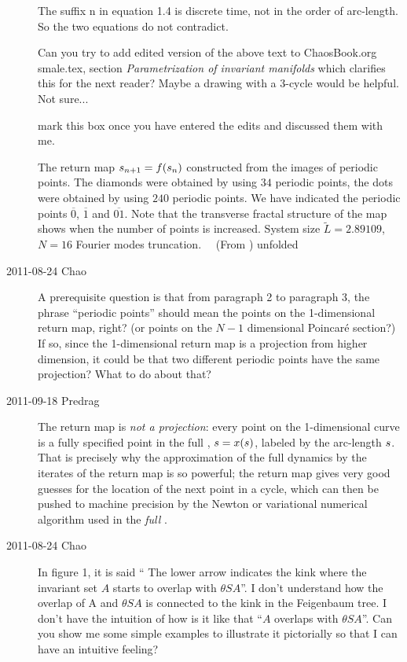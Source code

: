 \begin{description}
The suffix n in equation 1.4 is discrete time, not in the order of arc-length. So the two equations do not contradict. 

Can you try to add edited version of the above text to ChaosBook.org
smale.tex, section {\em Parametrization of invariant manifolds} which
clarifies this for the next reader? Maybe a drawing with a 3-cycle would
be helpful. Not sure...

 mark this box once you have entered the
edits and discussed them with me.

{}{
The return map $s_{n+1} = f(s_n)$ constructed from the images of periodic
points. The diamonds were obtained by using $34$ periodic points, the
dots were obtained by using $240$ periodic points. We have indicated the
periodic points $\overline{0}$, $\overline{1}$ and $\overline{01}$. Note
that the transverse fractal structure of the map shows when the number of
points is increased.
System size $ \tilde{L} = 2.89109$, $N=16$ Fourier modes truncation.
~~(From )
}{unfolded}


\item[2011-08-24 Chao]
A prerequisite question is that from paragraph 2 to paragraph 3, the
phrase ``periodic points'' should mean the points on the 1-dimensional
return map, right? (or points on the $N-1$ dimensional Poincar\'e
section?) If so, since the 1-dimensional return map is a projection from
higher dimension, it could be that two different periodic points have the
same projection? What to do about that?

\item[2011-09-18 Predrag]                            \toCB
The return map  is \emph{not a projection}: every point
on the 1-dimensional curve is a fully specified point in the full
\statesp, $s = x(s)$, labeled by the arc-length $s$. That is precisely
why the approximation of the full dynamics by the iterates of the return
map is so powerful; the return map gives very good guesses for the
location of the next point in a cycle, which can then be pushed to
machine precision by the Newton or variational numerical algorithm used
in the \emph{full \statesp}.

\item[2011-08-24 Chao]
In figure 1, it is said `` The lower arrow indicates the kink where the
invariant set $A$ starts to overlap with $\theta SA$''. I don't understand
how the overlap of A and $\theta SA$ is connected to the kink in the
Feigenbaum tree. I don't have the intuition of how is it like that
``$A$ overlaps with $\theta SA$''. Can you show me some simple examples to
illustrate it pictorially so that I can have an intuitive feeling?


\end{description}
